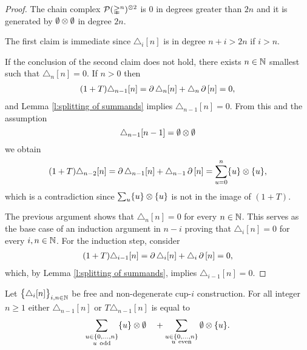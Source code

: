 \begin{proof}
	The chain complex $\mathcal{P}(\mathbb{\Delta}^n)^{\otimes 2}$ is $0$ in degrees greater than $2n$ and it is generated by $\emptyset \otimes \emptyset$ in degree $2n$.

	The first claim is immediate since $\triangle_i[n]$ is in degree $n+i > 2n$ if $i > n$.

	If the conclusion of the second claim does not hold, there exists $n \in \mathbb{N}$ smallest such that $\triangle_n [n] = 0$.
	If $n > 0$ then
	\begin{align*}
	(1+T) \triangle_{n-1} [n] =
	\operatorname{\partial} \triangle_{n} [n] + \triangle_{n} \operatorname{\partial} \, [n] = 0,
	\end{align*}
	and Lemma \ref{l:splitting of summands} implies $\triangle_{n-1} [n] = 0$.
	From this and the assumption
	\[
	\triangle_{n-1}[n-1] = \emptyset \otimes \emptyset
	\]
	we obtain
	\begin{equation}
	\begin{split}
	(1+T)\triangle_{n-2} [n] =
	\operatorname{\partial} \triangle_{n-1} [n] + \triangle_{n-1} \operatorname{\partial} \, [n] =
	\sum_{u = 0}^n \{u\} \otimes \{u\},
	\end{split}
	\end{equation}
	which is a contradiction since $\sum_u \{u\} \otimes \{u\}$ is not in the image of $(1+T)$.

	The previous argument shows that $\triangle_n [n] = 0$ for every $n \in \mathbb{N}$.
	This serves as the base case of an induction argument in $n-i$ proving that $\triangle_i [n] = 0$ for every $i, n \in \mathbb{N}$.
	For the induction step, consider
	\begin{align*}
	(1+T) \triangle_{i-1} [n] =
	\operatorname{\partial} \triangle_{i} [n] + \triangle_{i} \operatorname{\partial}\, [n] = 0,
	\end{align*}
	which, by Lemma \ref{l:splitting of summands}, implies $\triangle_{i-1} [n] = 0$.
\end{proof}

\begin{lemma} \label{l:special case two}
	Let $\big\{ \triangle_i [n] \big\}_{i,n\in\mathbb{N}}$ be free and non-degenerate cup-$i$ construction.
	For all integer $n \geq 1$ either $\triangle_{n-1} [n]$ or $T \triangle_{n-1} [n]$ is equal to
	\[
	\sum_{\substack{u \in \{0,\dots,n\} \\ u \ \mathrm{odd}}} \{u\} \otimes \emptyset
	\quad +
	\sum_{\substack{u \in \{0,\dots,n\} \\ u \ \mathrm{even}}} \emptyset \otimes \{u\}.
	\]
\end{lemma}

